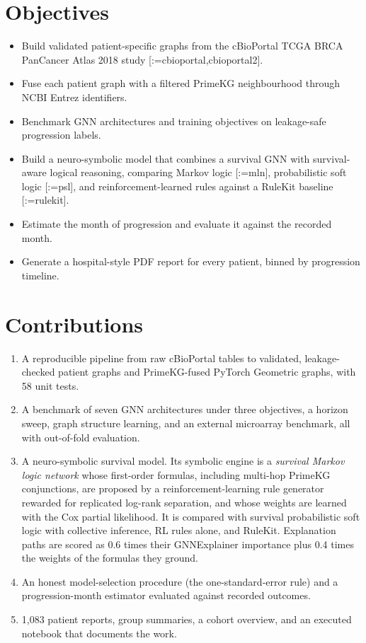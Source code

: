 \documentclass{mnnit}
\makeatletter
\newcommand{\rc}[1]{[\def\rc@sep{}\@for\rc@key:=#1\do{\rc@sep\ref{ref:\rc@key}\def\rc@sep{, }}]}
\makeatother
\begin{document}
\section{Objectives}
\begin{itemize}
  \item Build validated patient-specific graphs from the cBioPortal TCGA BRCA PanCancer Atlas 2018 study \rc{cbioportal,cbioportal2}.
  \item Fuse each patient graph with a filtered PrimeKG neighbourhood through NCBI Entrez identifiers.
  \item Benchmark GNN architectures and training objectives on leakage-safe progression labels.
  \item Build a neuro-symbolic model that combines a survival GNN with survival-aware logical reasoning, comparing Markov logic \rc{mln}, probabilistic soft logic \rc{psl}, and reinforcement-learned rules against a RuleKit baseline \rc{rulekit}.
  \item Estimate the month of progression and evaluate it against the recorded month.
  \item Generate a hospital-style PDF report for every patient, binned by progression timeline.
\end{itemize}

\section{Contributions}
\begin{enumerate}
  \item A reproducible pipeline from raw cBioPortal tables to validated, leakage-checked patient graphs and PrimeKG-fused PyTorch Geometric graphs, with 58 unit tests.
  \item A benchmark of seven GNN architectures under three objectives, a horizon sweep, graph structure learning, and an external microarray benchmark, all with out-of-fold evaluation.
  \item A neuro-symbolic survival model. Its symbolic engine is a \emph{survival Markov logic network} whose
        first-order formulas, including multi-hop PrimeKG conjunctions, are proposed by a reinforcement-learning
        rule generator rewarded for replicated log-rank separation, and whose weights are learned with the Cox
        partial likelihood. It is compared with survival probabilistic soft logic with collective inference, RL
        rules alone, and RuleKit. Explanation paths are scored as 0.6 times their GNNExplainer importance plus 0.4
        times the weights of the formulas they ground.
  \item An honest model-selection procedure (the one-standard-error rule) and a progression-month estimator evaluated against recorded outcomes.
  \item 1,083 patient reports, group summaries, a cohort overview, and an executed notebook that documents the work.
\end{enumerate}
\end{document}
